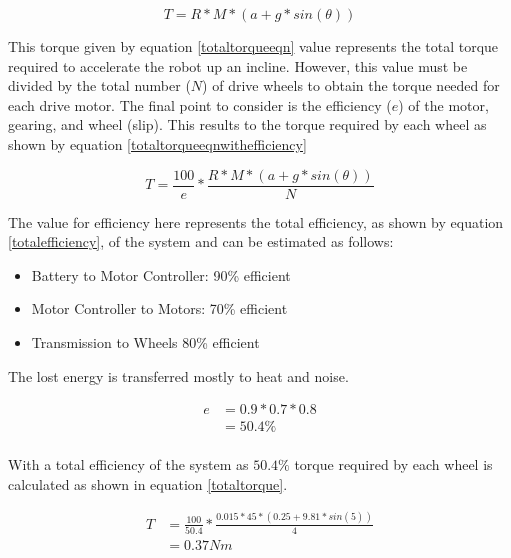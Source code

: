 \begin{equation} \label{totaltorqueeqn}
T = R * M *( a + g * sin(\theta))
\end{equation}

This torque given by equation \ref{totaltorqueeqn} value represents the total torque required to accelerate the robot up an incline. However, this value must be divided by the total number ($N$) of drive wheels to obtain the torque needed for each drive motor. The final point to consider is the efficiency ($e$) of the motor, gearing, and wheel (slip). This results to the torque required by each wheel as shown by equation \ref{totaltorqueeqnwithefficiency}

\begin{equation} \label{totaltorqueeqnwithefficiency}
T = \frac{100}{e} * \frac{R * M *( a + g * sin(\theta))}{N}
\end{equation}

The value for efficiency here represents the total efficiency, as shown by equation \ref{totalefficiency}, of the system and can be estimated as follows:
\begin{itemize}
    \item Battery to Motor Controller: 90\% efficient
    \item Motor Controller to Motors: 70\% efficient
    \item Transmission to Wheels 80\% efficient
\end{itemize}
The lost energy is transferred mostly to heat and noise.

\begin{equation} \label{totalefficiency}
\begin{split}
e & = 0.9 * 0.7 * 0.8 \\
& = 50.4\% \\
\end{split}
\end{equation}

With a total efficiency of the system as $50.4\%$ torque required by each wheel is calculated as shown in equation \ref{totaltorque}.

\begin{equation} \label{totaltorque}
\begin{split}
T & = \frac{100}{50.4} * \frac{0.015 * 45  *( 0.25 + 9.81 * sin(5))}{4} \\
& = 0.37 Nm \\
\end{split}
\end{equation}

